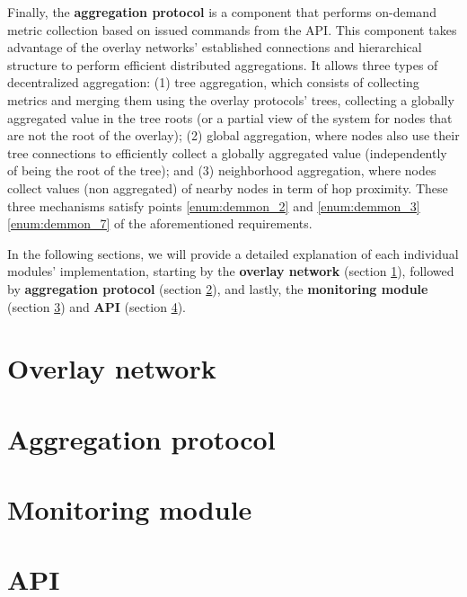 Finally, the \textbf{aggregation protocol} is a component that performs on-demand metric collection based on issued commands from the API. This component takes advantage of the overlay networks' established connections and hierarchical structure to perform efficient distributed aggregations. It allows three types of decentralized aggregation: (1) tree aggregation, which consists of collecting metrics and merging them using the overlay protocols' trees, collecting a globally aggregated value in the tree roots (or a partial view of the system for nodes that are not the root of the overlay); (2) global aggregation, where nodes also use their tree connections to efficiently collect a globally aggregated value (independently of being the root of the tree); and (3) neighborhood aggregation, where nodes collect values (non aggregated) of nearby nodes in term of hop proximity. These three mechanisms satisfy points \ref{enum:demmon_2} and \ref{enum:demmon_3} \ref{enum:demmon_7} of the aforementioned requirements. 

In the following sections, we will provide a detailed explanation of each individual modules' implementation, starting by the \textbf{overlay network} (section \ref{sec:overlay_network}), followed by \textbf{aggregation protocol} (section \ref{sec:mon_protocol}), and lastly, the \textbf{monitoring module} (section \ref{sec:mon_module}) and \textbf{API} (section \ref{sec:api}). 

\section{Overlay network} 
\label{sec:overlay_network}


\section{Aggregation protocol}
\label{sec:mon_protocol}


\section{Monitoring module}
\label{sec:mon_module}


\section{API}
\label{sec:api}


